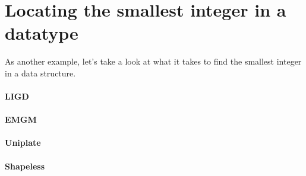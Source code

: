 \section{Locating the smallest integer in a datatype}
As another example, let's take a look at what it takes to find the smallest
integer in a data structure.

\paragraph{LIGD}

\paragraph{EMGM}

\paragraph{Uniplate}

\paragraph{Shapeless}
